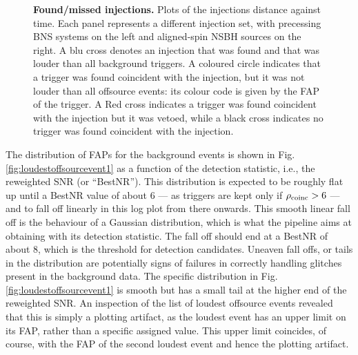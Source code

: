 \documentclass[binding=0.6cm, LaM]{sapthesis}
\begin{document}
        \begin{figure}[!t]
          \noindent
          \label{missinj1}
          \centering
          \caption{\textbf{Found/missed injections.} Plots of the injections distance against time. Each panel represents a different injection set, with precessing BNS systems on the left and aligned-spin NSBH sources on the right. A blu cross denotes an injection that was found and that was louder than all background triggers. A coloured circle indicates that a trigger was found coincident with the injection, but it was not louder than all offsource events: its colour code is given by the FAP of the trigger.  A Red cross indicates a trigger was found coincident with the injection but it was vetoed, while a black cross indicates no trigger was found coincident with the injection.}
          \label{fig:missinj1}
        \end{figure}

	The distribution of FAPs for the background events is shown in Fig.\,\ref{fig:loudestoffsourcevent1} 
	as a function of the detection statistic, i.e., the reweighted SNR (or ``BestNR'').
	This distribution is expected to be roughly flat up until a BestNR value of about $6$ 
	--- as triggers are kept only if $\rho_{\rm coinc} > 6$ --- 
	and to fall off linearly in this log plot from there onwards.  
	This smooth linear fall off is the behaviour of a Gaussian distribution, 
	which is what the pipeline aims at obtaining with its detection statistic.  
	The fall off should end at a BestNR  of about $8$, 
	which is the threshold for detection candidates. 
	Uneaven fall offs, or tails in the distribution are potentially signs 
	of failures in correctly handling glitches present in the background data. 
	The specific distribution in Fig.\,\ref{fig:loudestoffsourcevent1} is smooth 
	but has a small tail at the higher end of the reweighted SNR. 
	An inspection of the list of loudest offsource events revealed that 
	this is simply a plotting artifact, as the loudest event has an upper limit on its FAP, 
	rather than a specific assigned value.  
	This upper limit coincides, of course, with the FAP of the second loudest event and hence the plotting artifact.
\end{document}
